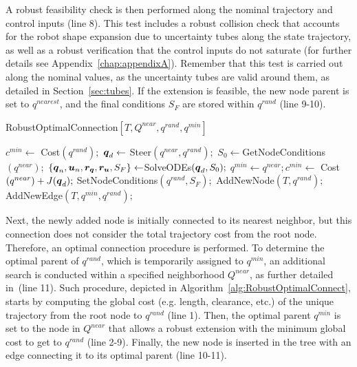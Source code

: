 A robust feasibility check is then performed along the nominal trajectory and control inputs (line 8).
This test includes a robust collision check that accounts for the robot shape expansion due to uncertainty tubes along the state trajectory, as well as a robust verification that the control inputs do not saturate (for further details see Appendix~\ref{chap:appendixA}).
Remember that this test is carried out along the nominal values, as the uncertainty tubes are valid around them, as detailed in Section~\ref{sec:tubes}.
If the extension is feasible, the new node parent is set to $q^{nearest}$, and the final conditions $S_F$ are stored within $q^{rand}$ (line 9-10).

\begin{algorithm}[h!]
    \caption{RobustOptimalConnection$[T, Q^{near}, q^{rand}, q^{min}]$}\label{alg:RobustOptimalConnect}
    \begin{algorithmic}[1]
        \State $c^{min} \gets$ Cost$(q^{rand});$
            \State $\boldsymbol{q}_d \gets$ Steer$(q^{near},q^{rand});$
            \State $S_0 \gets $GetNodeConditions$({q^{near}});$
            \State $\left \{\boldsymbol{q}_n, \boldsymbol{u}_n, \boldsymbol{r_q}, \boldsymbol{r_u}, S_F \right \}  \gets $SolveODEs$(\boldsymbol{q}_d, S_0);$
                    \State $q^{min} \gets q^{near}; c^{min} \gets$ Cost$(q^{near}) + J(\boldsymbol{q}_d);$
                    \State SetNodeConditions$({q^{rand}}, S_{F});$
                \EndIf
            \EndIf
        \EndFor
        \State AddNewNode$(T, {q^{rand}});$
        \State AddNewEdge$(T, {q^{min}}, {q^{rand}});$
    \end{algorithmic}
\end{algorithm}

Next, the newly added node is initially connected to its nearest neighbor, but this connection does not consider the total trajectory cost from the root node. 
Therefore, an optimal connection procedure is performed. 
To determine the optimal parent of $q^{rand}$, which is temporarily assigned to $q^{min}$, an additional search is conducted within a specified neighborhood $Q^{near}$, as further detailed in~\cite{cRRTstar}(line 11).
Such procedure, depicted in Algorithm~\ref{alg:RobustOptimalConnect}, starts by computing the global cost (e.g. length, clearance, etc.) of the unique trajectory from the root node to $q^{rand}$ (line 1).
Then, the optimal parent $q^{min}$ is set to the node in $Q^{near}$ that allows a robust extension with the minimum global cost to get to $q^{rand}$ (line 2-9).
Finally, the new node is inserted in the tree with an edge connecting it to its optimal parent (line 10-11).

